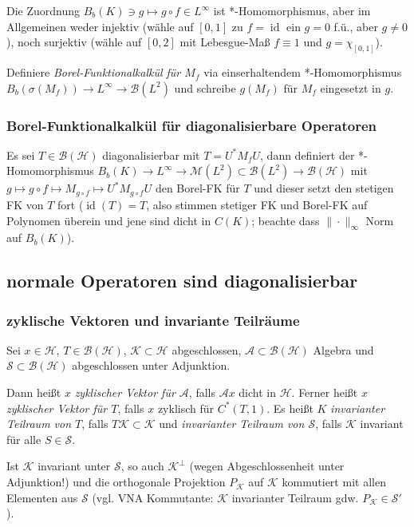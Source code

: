 \documentclass[11pt,a4paper]{scrartcl}
\newcommand{\Hc}{\mathcal{H}}
\newcommand{\Sc}{\mathcal{S}}
\newcommand{\Kc}{\mathcal{K}}
\newcommand{\A}{\mathcal{A}}
\newcommand{\B}{\mathcal{B}}
\newcommand{\M}{\mathcal{M}}
\theoremstyle{plain}
\theoremstyle{definition}
\theoremstyle{remark}
\DeclareMathOperator{\id}{id}
\begin{document}
Die Zuordnung $B_b(K) \ni g \mapsto g\circ f \in L^\infty$ ist *-Homomorphismus, aber im Allgemeinen weder injektiv (wähle auf $[0,1]$ zu $f=\id$ ein $g=0$ f.ü., aber $g\neq 0$), noch surjektiv (wähle auf $[0,2]$ mit Lebesgue-Maß $f\equiv 1$ und $g=\chi_{[0,1]}$).

Definiere \emph{Borel-Funktionalkalkül für $M_f$} via einserhaltendem *-Homomorphismus $B_b(\sigma(M_f)) \to L^\infty \to \B(L^2)$ und schreibe $g(M_f)$ für $M_f$ eingesetzt in $g$. 

\subsubsection{Borel-Funktionalkalkül für diagonalisierbare Operatoren}

Es sei $T\in \B(\Hc)$ diagonalisierbar mit $T=U^*M_f U$, dann definiert der *-Homomorphismus $B_b(K)\to L^\infty \to \M(L^2) \subset \B(L^2) \to \B(\Hc)$ mit $g\mapsto g\circ f \mapsto M_{g\circ f} \mapsto U^* M_{g\circ f} U$ den Borel-FK für $T$ und dieser setzt den stetigen FK von $T$ fort ($\id(T)=T$, also stimmen stetiger FK und Borel-FK auf Polynomen überein und jene sind dicht in $C(K)$; beachte dass $\|\cdot\|_\infty$ Norm auf $B_b(K)$).

\subsection{normale Operatoren sind diagonalisierbar}

\subsubsection{zyklische Vektoren und invariante Teilräume}

Sei $x\in \Hc$, $T\in \B(\Hc)$, $\Kc \subset \Hc$ abgeschlossen, $\A \subset \B(\Hc)$ Algebra und $\Sc \subset \B(\Hc)$ abgeschlossen unter Adjunktion.

Dann heißt $x$ \emph{zyklischer Vektor für $\A$}, falls $\A x$ dicht in $\Hc$. Ferner heißt $x$ \emph{zyklischer Vektor für $T$}, falls $x$ zyklisch für $C^*(T,1)$. Es heißt $K$ \emph{invarianter Teilraum von $T$}, falls $T\Kc \subset \Kc$ und \emph{invarianter Teilraum von $\Sc$}, falls $\Kc$ invariant für alle $S\in \Sc$. 

Ist $\Kc$ invariant unter $\Sc$, so auch $\Kc^\bot$ (wegen Abgeschlossenheit unter Adjunktion!) und die orthogonale Projektion $P_\Kc$ auf $\Kc$ kommutiert mit allen Elementen aus $\Sc$ (vgl. VNA Kommutante: $\Kc$ invarianter Teilraum gdw. $P_\Kc\in \Sc'$).
\end{document}
